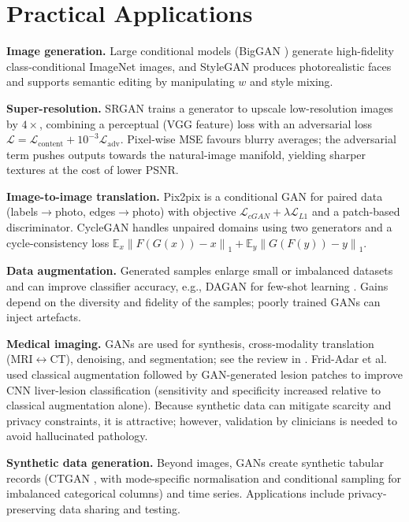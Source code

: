 \documentclass[conference]{IEEEtran}
\newcommand{\E}{\mathbb{E}}
\newcommand{\norm}[1]{\left\lVert #1 \right\rVert}
\theoremstyle{plain}
\theoremstyle{definition}
\begin{document}
\section{Practical Applications}\label{sec:app}

\textbf{Image generation.} Large conditional models (BigGAN \cite{brock2019biggan}) generate high-fidelity class-conditional ImageNet images, and StyleGAN produces photorealistic faces and supports semantic editing by manipulating $w$ and style mixing.

\textbf{Super-resolution.} SRGAN \cite{ledig2017srgan} trains a generator to upscale low-resolution images by $4\times$, combining a perceptual (VGG feature) loss with an adversarial loss $\mathcal{L}=\mathcal{L}_{\text{content}}+10^{-3}\mathcal{L}_{\text{adv}}$. Pixel-wise MSE favours blurry averages; the adversarial term pushes outputs towards the natural-image manifold, yielding sharper textures at the cost of lower PSNR.

\textbf{Image-to-image translation.} Pix2pix \cite{isola2017pix2pix} is a conditional GAN for paired data (labels$\to$photo, edges$\to$photo) with objective $\mathcal{L}_{cGAN}+\lambda\mathcal{L}_{L1}$ and a patch-based discriminator. CycleGAN \cite{zhu2017cyclegan} handles unpaired domains using two generators and a cycle-consistency loss $\E_x\norm{F(G(x))-x}_1+\E_y\norm{G(F(y))-y}_1$.

\textbf{Data augmentation.} Generated samples enlarge small or imbalanced datasets and can improve classifier accuracy, e.g., DAGAN for few-shot learning \cite{antoniou2017dagan}. Gains depend on the diversity and fidelity of the samples; poorly trained GANs can inject artefacts.

\textbf{Medical imaging.} GANs are used for synthesis, cross-modality translation (MRI$\leftrightarrow$CT), denoising, and segmentation; see the review in \cite{yi2019medical}. Frid-Adar et al.\ \cite{fridadar2018liver} used classical augmentation followed by GAN-generated lesion patches to improve CNN liver-lesion classification (sensitivity and specificity increased relative to classical augmentation alone). Because synthetic data can mitigate scarcity and privacy constraints, it is attractive; however, validation by clinicians is needed to avoid hallucinated pathology.

\textbf{Synthetic data generation.} Beyond images, GANs create synthetic tabular records (CTGAN \cite{xu2019ctgan}, with mode-specific normalisation and conditional sampling for imbalanced categorical columns) and time series. Applications include privacy-preserving data sharing and testing.
\end{document}
